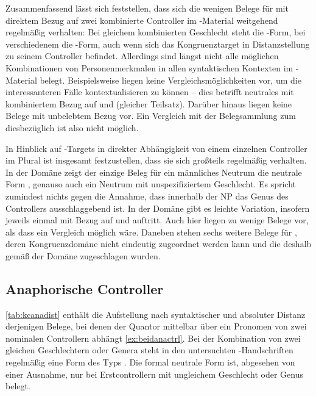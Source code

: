 Zusammenfassend lässt sich feststellen, dass sich die wenigen Belege für
 mit direktem Bezug auf zwei kombinierte Controller im
\KC{}-Material weitgehend regelmäßig verhalten: Bei gleichem
kombinierten Geschlecht steht die -Form, bei verschiedenem die
-Form, auch wenn sich das Kongruenztarget in Distanzstellung zu seinem
Controller befindet. Allerdings sind längst nicht alle möglichen Kombinationen
von Personenmerkmalen in allen syntaktischen Kontexten im
\KC{}-Material belegt. Beispielsweise liegen keine
Vergleichs\-möglich\-keiten vor, um die interessanteren Fälle kontextualisieren
zu können -- dies betrifft neutrales  mit kombiniertem Bezug auf
  und  (gleicher Teilsatz). Darüber
hinaus liegen keine Belege mit unbelebtem Bezug vor. Ein Vergleich mit der
Belegsammlung zum \CAO{} diesbezüglich ist also nicht möglich.

In Hinblick auf -Targets in direkter Abhängigkeit von einem
einzelnen Controller im Plural ist insgesamt festzustellen, dass sie sich
großteils regelmäßig verhalten. In der Domäne  zeigt der
einzige Beleg für ein männliches Neutrum die neutrale Form ,
genauso auch ein Neutrum mit unspezifiziertem Geschlecht. Es spricht zumindest
nichts gegen die Annahme, dass innerhalb der NP das Genus des Controllers
ausschlaggebend ist. In der Domäne  gibt es leichte
Variation, insofern jeweils einmal  mit Bezug auf
  und
  auftritt. Auch hier liegen zu wenige Belege vor,
als dass ein Vergleich möglich wäre.
Daneben stehen sechs weitere Belege für , deren Kongruenzdomäne
nicht eindeutig zugeordnet werden kann und die deshalb gemäß \citet[623]{ksw2} der Domäne  zugeschlagen wurden.

\subsection{Anaphorische Controller}

\cref{tab:kcanadist} enthält die Aufstellung nach syntaktischer und absoluter
Distanz derjenigen Belege, bei denen der Quantor  mittelbar
über ein Pronomen von zwei nominalen Controllern abhängt
\cref{ex:beidanactrl}. Bei der Kombination von zwei gleichen Geschlechtern
oder Genera steht in den untersuchten \KC{}-Handschriften
regelmäßig eine Form des Typs . Die formal neutrale Form
 ist, abgesehen von einer Ausnahme, nur bei Erstcontrollern mit
ungleichem Geschlecht oder Genus belegt.

